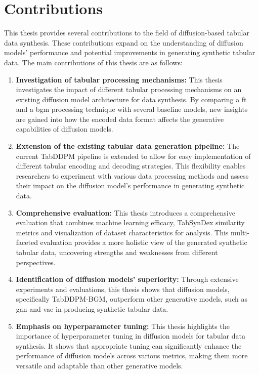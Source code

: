 \section{Contributions}
\label{ch:intro-contributions}
This thesis provides several contributions to the field of diffusion-based tabular data synthesis.
These contributions expand on the understanding of diffusion models' performance and potential improvements in generating synthetic tabular data.
The main contributions of this thesis are as follows:
\begin{enumerate}
	\item \textbf{Investigation of tabular processing mechanisms:}
	      This thesis investigates the impact of different tabular processing mechanisms on an existing diffusion \gls{model} architecture for data synthesis.
	      By comparing a \acrfull{ft} and a \acrfull{bgm} processing technique with several baseline models, new insights are gained into how the encoded data format affects the generative capabilities of diffusion models.
	\item \textbf{Extension of the existing tabular data generation pipeline:}
	      The current TabDDPM \cite{kotelnikov2022TabDDPMModellingTabular} pipeline is extended to allow for easy implementation of different tabular encoding and decoding strategies.
	      This flexibility enables researchers to experiment with various data processing methods and assess their impact on the diffusion \gls{model}'s performance in generating synthetic data.
	\item \textbf{Comprehensive evaluation:}
	      This thesis introduces a comprehensive evaluation that combines machine learning efficacy,
	      TabSynDex similarity metrics and visualization of dataset characteristics for analysis.
	      This multi-faceted evaluation provides a more holistic view of the generated synthetic tabular data,
	      uncovering strengths and weaknesses from different perspectives.
	\item \textbf{Identification of diffusion models' superiority:}
	      Through extensive experiments and evaluations, this thesis shows that diffusion models, specifically TabDDPM-BGM, outperform other generative models, such as \gls{gan} and \gls{vae} in producing synthetic tabular data.
	\item \textbf{Emphasis on hyperparameter tuning:}
	      This thesis highlights the importance of hyperparameter tuning in diffusion models for tabular data synthesis.
	      It shows that appropriate tuning can significantly enhance the performance of diffusion models across various metrics,
	      making them more versatile and adaptable than other generative models.
\end{enumerate}

